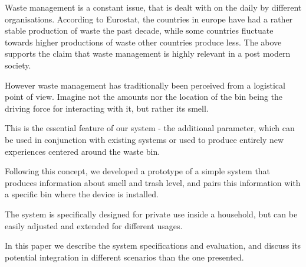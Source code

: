 Waste management is a constant issue, that is dealt with on the daily by different organisations.
According to Eurostat, the countries in europe have had a rather stable production of waste the past decade, while some countries fluctuate towards higher productions of waste other countries produce less. 
The above supports the claim that waste management is highly relevant in a post modern society.

However waste management has traditionally been perceived from a logistical point of view.
Imagine not the amounts nor the location of the bin being the driving force for interacting with it, but rather its smell.

This is the essential feature of our system - the additional parameter, which can be used in conjunction with existing systems or used to produce entirely new experiences centered around the waste bin.

Following this concept, we developed a prototype of a simple system that produces information about smell and trash level, and pairs this information with a specific bin where the device is installed. 

The system is specifically designed for private use inside a household, but can be easily adjusted and extended for different usages.

In this paper we describe the system specifications and evaluation, and discuss its potential integration in different scenarios than the one presented.